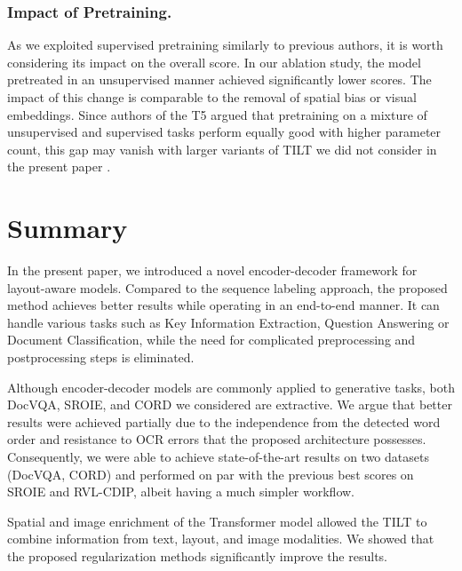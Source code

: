 \documentclass[runningheads]{llncs}
\begin{document}
\subsubsection{Impact of Pretraining.} As we exploited supervised pretraining similarly to previous authors, it is worth considering its impact on the overall score. In our ablation study, the model pretreated in an unsupervised manner achieved significantly lower scores. The impact of this change is comparable to the removal of spatial bias or visual embeddings. Since authors of the T5 argued that pretraining on a mixture of unsupervised and supervised tasks perform equally good with higher parameter count, this gap may vanish with larger variants of TILT we did not consider in the present paper \cite{2020t5}.













\section{Summary}

In the present paper, we introduced a novel encoder-decoder framework for layout-aware models. Compared to the sequence labeling approach, the proposed method achieves better results while operating in an end-to-end manner. It can handle various tasks such as Key Information Extraction, Question Answering or Document Classification, while the need for complicated preprocessing and postprocessing steps is eliminated.

Although encoder-decoder models are commonly applied to generative tasks, both DocVQA, SROIE, and CORD we considered are extractive. We argue that better results were achieved partially due to the independence from the detected word order and resistance to OCR errors that the proposed architecture possesses. 
Consequently, we were able to achieve state-of-the-art results on two datasets (DocVQA, CORD) and performed on par with the previous best scores on SROIE and RVL-CDIP, albeit having a much simpler workflow.

Spatial and image enrichment of the Transformer model allowed the TILT to combine information from text, layout, and image modalities. We showed that the proposed regularization methods significantly improve the results.
\end{document}
